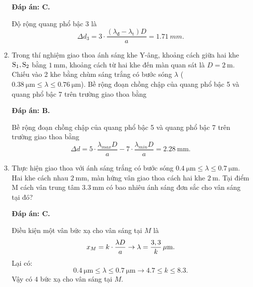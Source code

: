 \begin{enumerate}[label=\bfseries Câu \arabic*:]
	\loigiai
	{		\textbf{Đáp án: C.}
		
Độ rộng quang phổ bậc 3 là
$$
	\Delta d_{3} = 3 \cdot \dfrac{(\lambda_{\text{đ}} - \lambda_{\text{t}})D}{a} = \SI{1,71}{mm}.
$$
		
	}
	
	\item {} 
	
	\cauhoi
	{Trong thí nghiệm giao thoa ánh sáng khe Y-âng, khoảng cách giữa hai khe $\text S_1, \text S_2$ bằng $\SI{1}{\milli \meter}$, khoảng cách từ hai khe đến màn quan sát là $D=\SI{2}{\meter}$. Chiếu vào 2 khe bằng chùm sáng trắng có bước sóng $\lambda$ ($\SI{0.38}{\micro \meter} \leq \lambda \leq \SI{0.76}{\micro \meter}$). Bề rộng đoạn chồng chập của quang phổ bậc 5 và quang phổ bậc 7 trên trường giao thoa bằng
	}
	
	\loigiai
	{		\textbf{Đáp án: B.}
		
Bề rộng đoạn chồng chập của quang phổ bậc 5 và quang phổ bậc 7 trên trường giao thoa bằng
$$
	\Delta d = 5 \cdot \dfrac{\lambda_{max} D}{a} - 7 \cdot \dfrac{\lambda_{min} D}{a} = \SI{2.28}{\milli \meter}. 
$$
			
	}
	
	\item {} 
	
	\cauhoi
	{Thực hiện giao thoa với ánh sáng trắng có bước sóng $\SI{0.4}{\micro \meter} \leq \lambda \leq \SI{0.7}{\micro \meter}$. Hai khe cách nhau $\SI{2}{\milli \meter}$, màn hứng vân giao thoa cách hai khe $\SI{2}{\meter}$. Tại điểm M cách vân trung tâm $\SI{3.3}{\milli \meter}$ có bao nhiêu ánh sáng đơn sắc cho vân sáng tại đó?
	}
	
	\loigiai
	{		\textbf{Đáp án: C.}
		
Điều kiện một vân bức xạ cho vân sáng tại $ M $ là
$$
	x_{M} = k \cdot \dfrac{\lambda D}{a} \rightarrow \lambda = \xsi{\dfrac{3,3}{k}}{\mu m}.
$$
Lại có:
$$
	\SI{0.4}{\micro \meter} \leq \lambda \leq \SI{0.7}{\micro \meter} \rightarrow \num{4,7} \leq k \leq \num{8,3}.
$$
Vậy có $ 4 $ bức xạ cho vân sáng tại $ M $.
		
}
\end{enumerate}
